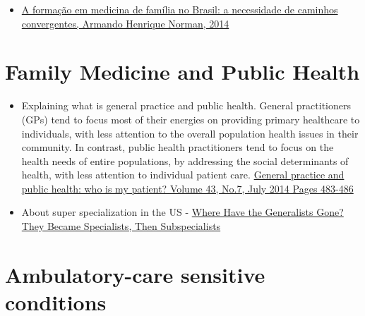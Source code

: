 \documentclass[]{book}
\providecommand{\tightlist}{%
  \setlength{\itemsep}{0pt}\setlength{\parskip}{0pt}}
\begin{document}
\begin{itemize}
\tightlist
\item
  \href{https://www.rbmfc.org.br/rbmfc/article/view/875}{A formação em medicina de família no Brasil: a necessidade de caminhos convergentes, Armando Henrique Norman, 2014}
\end{itemize}

\hypertarget{family-medicine-and-public-health}{%
\section*{Family Medicine and Public Health}\label{family-medicine-and-public-health}}

\begin{itemize}
\item
  Explaining what is general practice and public health. General practitioners (GPs) tend to focus most of their energies on providing primary healthcare to individuals, with less attention to the overall population health issues in their community. In contrast, public health practitioners tend to focus on the health needs of entire populations, by addressing the social determinants of health, with less attention to individual patient care.
  \href{https://www.racgp.org.au/afp/2014/july/who-is-my-patient/}{General practice and public health: who is my patient? Volume 43, No.7, July 2014 Pages 483-486}
\item
  About super specialization in the US - \href{https://www.amjmed.com/article/S0002-9343\%2817\%2930134-1/pdf}{Where Have the Generalists Gone? They Became Specialists, Then Subspecialists}
\end{itemize}

\hypertarget{ambulatory-care-sensitive-conditions}{%
\section*{Ambulatory-care sensitive conditions}\label{ambulatory-care-sensitive-conditions}}
\end{document}
